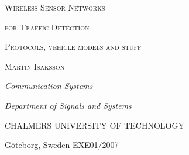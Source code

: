 \thispagestyle{empty} 	%
\textbf{}

\vfill

\textsc{\huge Wireless Sensor Networks}

\vspace{0.1cm}

\textsc{\huge for Traffic Detection}

\vspace{0.6cm}

\textsc{\Large Protocols, vehicle models and stuff}

\vspace{1.5cm}

\textsc{\Large Martin Isaksson}

\vspace{1.0cm}


\vspace{1.0cm}
{\large \it Communication Systems}

\vspace{-0.3cm}

{\large \it Department of Signals and Systems}

\vspace{-0.3cm}

\textsc{CHALMERS UNIVERSITY OF TECHNOLOGY}

\vspace{-0.3cm}

{\large G\"{o}teborg, Sweden \hfill EXE01/2007}
